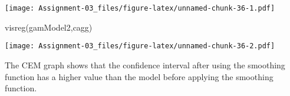 \documentclass[
]{article}
\newenvironment{Shaded}{\begin{snugshade}}{\end{snugshade}}
\newcommand{\FunctionTok}[1]{\textcolor[rgb]{0.00,0.00,0.00}{#1}}
\newcommand{\NormalTok}[1]{#1}
\newcommand{\StringTok}[1]{\textcolor[rgb]{0.31,0.60,0.02}{#1}}
\begin{document}
\texttt{[image: Assignment-03\_files/figure-latex/unnamed-chunk-36-1.pdf]}

\begin{Shaded}
\begin{Highlighting}[]
\FunctionTok{visreg}\NormalTok{(gamModel2,}\StringTok{\textquotesingle{}cagg\textquotesingle{}}\NormalTok{)}
\end{Highlighting}
\end{Shaded}

\texttt{[image: Assignment-03\_files/figure-latex/unnamed-chunk-36-2.pdf]}

The CEM graph shows that the confidence interval after using the
smoothing function has a higher value than the model before applying the
smoothing function.
\end{document}
